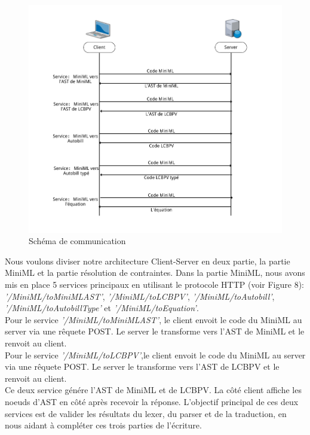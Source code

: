 \documentclass[12pt]{article}
\begin{document}
\begin{figure}[!b]
      \centering
      \includegraphics[scale=0.4]{Figures/CommunicationMiniML.png}
      \caption{Schéma de communication}
\end{figure}
\pagebreak

Nous voulons diviser notre architecture Client-Server en deux partie, la partie MiniML et la partie résolution de contraintes.
Dans la partie MiniML, nous avons mis en place 5 services principaux en utilisant le protocole HTTP (voir Figure 8): \emph{'/MiniML/toMiniMLAST'}, \emph{'/MiniML/toLCBPV'}, \emph{'/MiniML/toAutobill'}, \emph{'/MiniML/toAutobillType'} et \emph{'/MiniML/toEquation'}. \\

Pour le service \emph{'/MiniML/toMiniMLAST'}, le client envoit le code du MiniML au server via une rêquete POST. Le server le transforme vers l'AST de MiniML et le renvoit au client.\\
Pour le service \emph{'/MiniML/toLCBPV'},le client envoit le code du MiniML au server via une rêquete POST. Le server le transforme vers l'AST de LCBPV et le renvoit au client.\\
Ce deux service génére l'AST de MiniML et de LCBPV. La côté client affiche les noeuds d'AST en côté après recevoir la réponse. L'objectif principal de ces deux services est de valider les résultats du lexer, du parser et de la traduction, en nous aidant à compléter ces trois parties de l'écriture.\\
\end{document}
